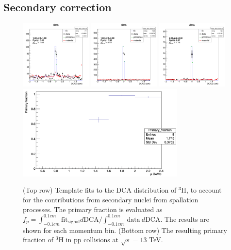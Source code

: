 \subsection{Secondary correction}
\begin{figure}
    \centering
    \includegraphics[width=0.32\textwidth]{figures/triton/Templates/TemplateFitHe3_1.3<p<1.6_rebin_2_Bin_1.png}
    \includegraphics[width=0.32\textwidth]{figures/triton/Templates/TemplateFitHe3_1.6<p<2_rebin_2_Bin_2.png}
    \includegraphics[width=0.32\textwidth]{figures/triton/Templates/TemplateFitHe3_2<p<2.4_rebin_2_Bin_3.png}
    \includegraphics[width=0.75\textwidth]{figures/triton/tbar_Primary_fraction.png}
    \caption{(Top row) Template fits to the DCA distribution of $^3\mathrm{H}$, to account for the contributions from secondary nuclei from spallation processes. The primary fraction is evaluated as $f_p = \int_{-0.1cm}^{0.1cm} \mathrm{fit}_{\mathrm{signal}} d\mathrm{DCA} / \int_{-0.1cm}^{0.1cm}\ \mathrm{data}\ d\mathrm{DCA}$. The results are shown for each momentum bin. (Bottom row) The resulting primary fraction of $^3\mathrm{H}$ in pp collisions at $\sqrt{s}=13$ TeV.}
    \label{fig:TemplateFitsTriton}
\end{figure}
